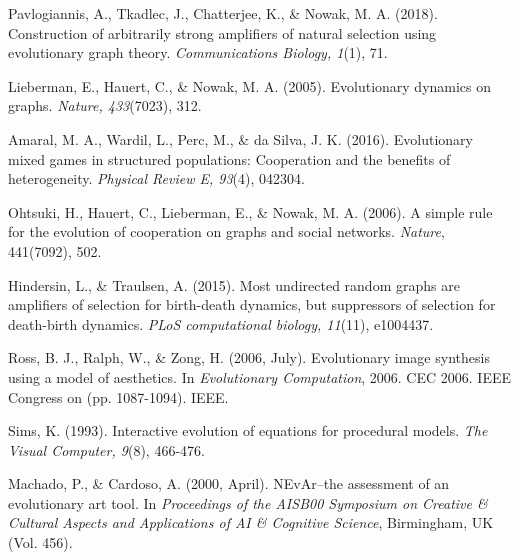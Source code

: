 \documentclass[10pt,a4paper]{article}
\begin{document}
\pagebreak
\begin{thebibliography}{9}

Pavlogiannis, A., Tkadlec, J., Chatterjee, K., \& Nowak, M. A. (2018). Construction of arbitrarily strong amplifiers of natural selection using evolutionary graph theory. \textit{Communications Biology, 1}(1), 71.

Lieberman, E., Hauert, C., \& Nowak, M. A. (2005). Evolutionary dynamics on graphs. \textit{Nature, 433}(7023), 312.

Amaral, M. A., Wardil, L., Perc, M., \& da Silva, J. K. (2016). Evolutionary mixed games in structured populations: Cooperation and the benefits of heterogeneity. 
\textit{Physical Review E, 93}(4), 042304.

Ohtsuki, H., Hauert, C., Lieberman, E., \& Nowak, M. A. (2006). A simple rule for the evolution of cooperation on graphs and social networks. \textit{Nature}, 441(7092), 502.

Hindersin, L., \& Traulsen, A. (2015). Most undirected random graphs are amplifiers of selection for birth-death dynamics, but suppressors of selection for death-birth dynamics.
\textit{PLoS computational biology, 11}(11), e1004437.

Ross, B. J., Ralph, W., \& Zong, H. (2006, July). Evolutionary image synthesis using a model of aesthetics. In \textit{Evolutionary Computation}, 2006. CEC 2006. IEEE Congress on (pp. 1087-1094). IEEE.

Sims, K. (1993). Interactive evolution of equations for procedural models. \textit{The Visual Computer, 9}(8), 466-476.

Machado, P., \& Cardoso, A. (2000, April). NEvAr–the assessment of an evolutionary art tool. In \textit{Proceedings of the AISB00 Symposium on Creative \& Cultural Aspects and Applications of AI \& Cognitive Science}, Birmingham, UK (Vol. 456).


\end{thebibliography}
\end{document}
